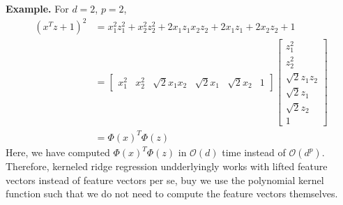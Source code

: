 \textbf{Example.}
For $d = 2$, $p = 2$,
\begin{align*}
    {(x^T z + 1)}^2
    &= x_1^2 z_1^2 + x_2^2 z_2^2 + 2 x_1 z_1 x_2 z_2 + 2 x_1 z_1 + 2 x_2 z_2 + 1 \\
    &= \begin{bmatrix} x_1^2 & x_2^2 & \sqrt{2} x_1 x_2 & \sqrt{2} x_1 & \sqrt{2} x_2 & 1 \end{bmatrix}
    \begin{bmatrix} z_1^2 \\ z_2^2 \\ \sqrt{2} z_1 z_2 \\ \sqrt{2} z_1 \\ \sqrt{2} z_2 \\ 1 \end{bmatrix} \\
    &= {\Phi(x)}^T \Phi(z)
\end{align*}
Here, we have computed ${\Phi(x)}^T \Phi(z)$ in $\mathcal{O}(d)$ time instead of $\mathcal{O}(d^p)$.
Therefore, kerneled ridge regression undderlyingly works with lifted feature vectors instead of feature vectors per se, buy we use the polynomial kernel function such that we do not need to compute the feature vectors themselves.
